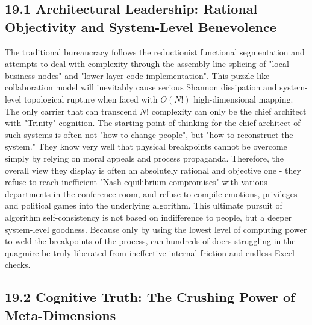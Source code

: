 \documentclass[11pt,a4paper]{article}
\begin{document}
\subsection*{19.1 Architectural Leadership: Rational Objectivity and System-Level Benevolence}


The traditional bureaucracy follows the reductionist functional segmentation and attempts to deal with complexity through the assembly line splicing of "local business nodes" and "lower-layer code implementation". This puzzle-like collaboration model will inevitably cause serious Shannon dissipation and system-level topological rupture when faced with $O(N!)$ high-dimensional mapping. The only carrier that can transcend $N!$ complexity can only be the chief architect with "Trinity" cognition. The starting point of thinking for the chief architect of such systems is often not "how to change people", but "how to reconstruct the system." They know very well that physical breakpoints cannot be overcome simply by relying on moral appeals and process propaganda. Therefore, the overall view they display is often an absolutely rational and objective one - they refuse to reach inefficient "Nash equilibrium compromises" with various departments in the conference room, and refuse to compile emotions, privileges and political games into the underlying algorithm. This ultimate pursuit of algorithm self-consistency is not based on indifference to people, but a deeper system-level goodness. Because only by using the lowest level of computing power to weld the breakpoints of the process, can hundreds of doers struggling in the quagmire be truly liberated from ineffective internal friction and endless Excel checks.


\subsection*{19.2 Cognitive Truth: The Crushing Power of Meta-Dimensions}
\end{document}
